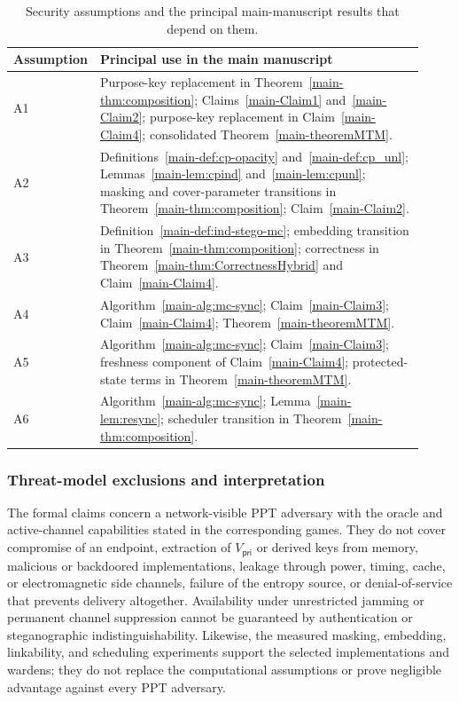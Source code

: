 \documentclass[journal]{IEEEtran}
\renewcommand{\arraystretch}{1.2}
\renewcommand{\arraystretch}{1.0}
\theoremstyle{definition}
\theoremstyle{game}
\renewcommand{\arraystretch}{1.5}
\begin{document}
\begin{table}[!t]
\centering
\caption{Security assumptions and the principal main-manuscript
results that depend on them.}
\label{supp-tab:assumption_mapping}
\small
\renewcommand{\arraystretch}{1.12}
\begin{tabular}{p{0.10\linewidth}p{0.82\linewidth}}
\toprule
\textbf{Assumption} & \textbf{Principal use in the main manuscript}\\
\midrule
A1 & Purpose-key replacement in Theorem~\ref{main-thm:composition}; Claims~\ref{main-Claim1} and~\ref{main-Claim2}; purpose-key replacement in Claim~\ref{main-Claim4}; consolidated Theorem~\ref{main-theoremMTM}.\\
A2 & Definitions~\ref{main-def:cp-opacity} and~\ref{main-def:cp_unl}; Lemmas~\ref{main-lem:cpind} and~\ref{main-lem:cpunl}; masking and cover-parameter transitions in Theorem~\ref{main-thm:composition}; Claim~\ref{main-Claim2}.\\
A3 & Definition~\ref{main-def:ind-stego-mc}; embedding transition in Theorem~\ref{main-thm:composition}; correctness in Theorem~\ref{main-thm:CorrectnessHybrid} and Claim~\ref{main-Claim4}.\\
A4 & Algorithm~\ref{main-alg:mc-sync}; Claim~\ref{main-Claim3}; Claim~\ref{main-Claim4}; Theorem~\ref{main-theoremMTM}.\\
A5 & Algorithm~\ref{main-alg:mc-sync}; Claim~\ref{main-Claim3}; freshness component of Claim~\ref{main-Claim4}; protected-state terms in Theorem~\ref{main-theoremMTM}.\\
A6 & Algorithm~\ref{main-alg:mc-sync}; Lemma~\ref{main-lem:resync}; scheduler transition in Theorem~\ref{main-thm:composition}.\\
\bottomrule
\end{tabular}
\end{table}

\subsubsection{Threat-model exclusions and interpretation}
\label{supp-subsec:assumption_scope}

The formal claims concern a network-visible PPT adversary with the
oracle and active-channel capabilities stated in the corresponding
games. They do not cover compromise of an endpoint, extraction of
$V_{\mathsf{pri}}$ or derived keys from memory, malicious or
backdoored implementations, leakage through power, timing, cache,
or electromagnetic side channels, failure of the entropy source,
or denial-of-service that prevents delivery altogether. Availability
under unrestricted jamming or permanent channel suppression cannot
be guaranteed by authentication or steganographic
indistinguishability. Likewise, the measured masking, embedding,
linkability, and scheduling experiments support the selected
implementations and wardens; they do not replace the computational
assumptions or prove negligible advantage against every PPT
adversary.
\end{document}
